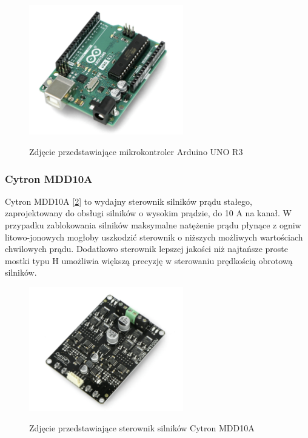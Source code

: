 \begin{figure}[h!]
        \centering
        \includegraphics[width=0.6\textwidth]{./graf/arduino-r3.png}
        \label{zdj:arduino-r3}
        \caption{Zdjęcie przedstawiające mikrokontroler Arduino UNO R3}
\end{figure}

\subsubsection*{Cytron MDD10A}
Cytron MDD10A [\ref{zdj:cytron}] to wydajny sterownik silników prądu stałego, zaprojektowany do obsługi silników o wysokim prądzie, do 10 A na kanał. W przypadku zablokowania silników maksymalne natężenie prądu płynące z ogniw litowo-jonowych mogłoby uszkodzić sterownik o niższych możliwych wartościach chwilowych prądu. Dodatkowo sterownik lepszej jakości niż najtańsze proste mostki typu H umożliwia większą precyzję w sterowaniu prędkością obrotową silników. 


\begin{figure}[h!]
        \centering
        \includegraphics[width=0.6\textwidth]{./graf/cytron-mdd10a.png}
        \label{zdj:cytron}
        \caption{Zdjęcie przedstawiające sterownik silników Cytron MDD10A}
\end{figure}

